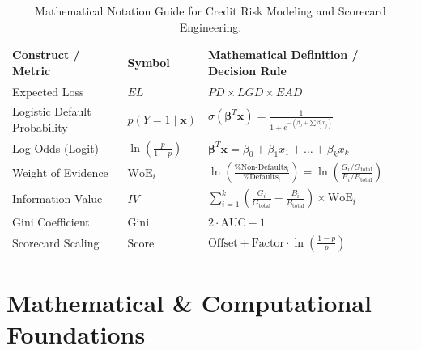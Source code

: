 \begin{table}[htbp]
\centering
\small
\begin{tabularx}{\textwidth}{llX}
\toprule
\textbf{Construct / Metric} & \textbf{Symbol} & \textbf{Mathematical Definition / Decision Rule} \\
\midrule
Expected Loss & $EL$ & $PD \times LGD \times EAD$ \\
Logistic Default Probability & $p(Y=1 \mid \mathbf{x})$ & $\sigma(\boldsymbol{\beta}^T \mathbf{x}) = \frac{1}{1 + e^{-(\beta_0 + \sum \beta_j x_j)}}$ \\
Log-Odds (Logit) & $\ln\left(\frac{p}{1-p}\right)$ & $\boldsymbol{\beta}^T \mathbf{x} = \beta_0 + \beta_1 x_1 + \dots + \beta_k x_k$ \\
Weight of Evidence & $\text{WoE}_i$ & $\ln\left(\frac{\% \text{Non-Defaults}_i}{\% \text{Defaults}_i}\right) = \ln\left(\frac{G_i / G_{\text{total}}}{B_i / B_{\text{total}}}\right)$ \\
Information Value & $IV$ & $\sum_{i=1}^k \left(\frac{G_i}{G_{\text{total}}} - \frac{B_i}{B_{\text{total}}}\right) \times \text{WoE}_i$ \\
Gini Coefficient & $\text{Gini}$ & $2 \cdot \text{AUC} - 1$ \\
Scorecard Scaling & $\text{Score}$ & $\text{Offset} + \text{Factor} \cdot \ln\left(\frac{1-p}{p}\right)$ \\
\bottomrule
\end{tabularx}
\caption{Mathematical Notation Guide for Credit Risk Modeling and Scorecard Engineering.}
\label{tab:w8_notation}
\end{table}

\section{Mathematical \& Computational Foundations}

